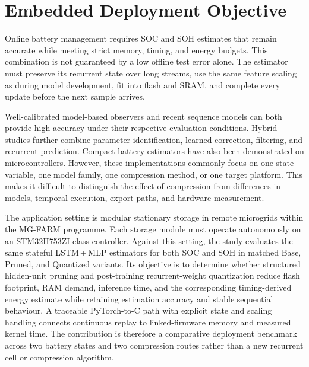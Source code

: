 \documentclass[
    a4paper,
    12pt,
    titlepage,
    bibliography=totoc,
    twoside=on,
    parskip=false,
    numbers=noenddot,
    cleardoublepage=empty,
    DIV=12,
    BCOR=12.0mm,
    headheight=36pt,
    headings=openright
]{scrreprt}
\begin{document}
\section{Embedded Deployment Objective}
\label{sec:embedded_objective}
Online battery management requires SOC and SOH estimates that remain accurate while meeting strict memory, timing, and energy budgets. This combination is not guaranteed by a low offline test error alone. The estimator must preserve its recurrent state over long streams, use the same feature scaling as during model development, fit into flash and SRAM, and complete every update before the next sample arrives.\autocite{yaoSmarterBatteryManagement2025b,a.m.s.m.h.s.attanayakaEstimationStateCharge2019,berecibarCriticalReviewState2016,shrivastavaReviewTechnologicalAdvancement2023,guoSystematicReviewElectrochemical2024}

Well-calibrated model-based observers and recent sequence models can both provide high accuracy under their respective evaluation conditions.\autocite{gaoCoEstimationStateofChargeStateof2022,gaoEnhancedStateofchargeEstimation2022,sunStateChargeEstimation2023,sunStateofchargeEstimationSodiumion2024} Hybrid studies further combine parameter identification, learned correction, filtering, and recurrent prediction.\autocite{wang_improved_2024,wang_improved_2023} Compact battery estimators have also been demonstrated on microcontrollers.\autocite{crocioniLiIonBatteriesParameter2020,giazitzisCaseStudyTiny2024,Embedded_AI_only_SOC_mobile,Embedded_AI_SOH_badData,naguibMicroprocessorExecutionTime2022} However, these implementations commonly focus on one state variable, one model family, one compression method, or one target platform. This makes it difficult to distinguish the effect of compression from differences in models, temporal execution, export paths, and hardware measurement.

The application setting is modular stationary storage in remote microgrids within the MG-FARM programme.\autocite{leap-reMGFARMSmart,microenergyMGFARMPoweringSustainable,aqachtoulMGFARMIoTEdgeDriven2026,technischeuniversitatberlinMGFarmSmart} Each storage module must operate autonomously on an STM32H753ZI-class controller. Against this setting, the study evaluates the same stateful LSTM\,+\,MLP estimators for both SOC and SOH in matched Base, Pruned, and Quantized variants. Its objective is to determine whether structured hidden-unit pruning and post-training recurrent-weight quantization reduce flash footprint, RAM demand, inference time, and the corresponding timing-derived energy estimate while retaining estimation accuracy and stable sequential behaviour. A traceable PyTorch-to-C path with explicit state and scaling handling connects continuous replay to linked-firmware memory and measured kernel time. The contribution is therefore a comparative deployment benchmark across two battery states and two compression routes rather than a new recurrent cell or compression algorithm.
\end{document}
